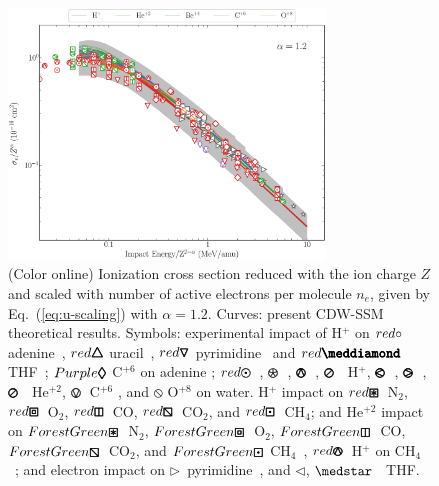 \documentclass[10pt,showpacs,showkeys,twocolumn]{revtex4-1}
\begin{document}
\begin{figure}[!htb]%
\centering
\includegraphics[width=0.75\textwidth]{zmol_werror.eps}
\caption{(Color online) Ionization cross section reduced with the ion
charge $Z$ and scaled with number of active electrons per molecule $n_e$,
given by Eq.~(\ref{eq:u-scaling}) with $\alpha=1.2$. 
Curves: present CDW-SSM theoretical results. 
Symbols: experimental impact of H$^+$ on 
\mbox{\LARGE$\color{red}\circ$} adenine~\cite{iriki2011}, 
{\fontsize{11}{20}$\color{red}\pmb{\triangle}$} uracil~\cite{itoh2013}, 
{\fontsize{11}{20}$\color{red}\pmb{\triangledown}$} pyrimidine~\cite{wolff2014} and 
{\fontsize{10}{20}$\color{red}\pmb{\meddiamond}$} THF~\cite{wang2016};
{\fontsize{11}{20}$\color{Purple}\pmb{\lozenge}$} C$^{+6}$ on adenine \cite{tribedi2019};
\mbox{\fontsize{11}{20}$\color{red}\pmb{\odot}$}~\cite{Luna2007}, 
{\fontsize{11}{20}\color{red}$\pmb{\logof}$}~\cite{Rudd86}, 
{\fontsize{11}{20}\color{red}$\pmb{\varowedge}$}~\cite{pRudd85}, 
{\fontsize{11}{20}\color{red}$\pmb{\varoslash}$}~\cite{toburen80} H$^+$,
{\fontsize{11}{20}\color{ForestGreen}$\pmb{\varolessthan}$}~\cite{Ohsawa05},
{\fontsize{11}{20}\color{ForestGreen}$\pmb{\varogreaterthan}$}~\cite{Rudd85},
{\fontsize{11}{20}\color{ForestGreen}$\pmb{\varoslash}$}~\cite{toburen80} He$^{+2}$,
{\fontsize{11}{20}\color{Purple}$\pmb{\ovee}$}~C$^{+6}$ \cite{DalCappello2009,Bhattacharjee17}, and 
{\fontsize{11}{20}\color{BurntOrange}$\pmb{\obslash}$}
O$^{+8}$ \cite{Tribedi_O_water} on water.
H$^{+}$ impact on 
{\fontsize{11}{20}${\color{red}\pmb{\boxast}}$}~N$_2$, 
{\fontsize{11}{20}${\color{red}\pmb{\boxbox}}$}~O$_2$, 
{\fontsize{11}{20}${\color{red}\pmb{\boxbar}}$}~CO, 
{\fontsize{11}{20}${\color{red}\pmb{\boxbslash}}$}~CO$_2$, and
{\fontsize{11}{20}${\color{red}\pmb{\boxdot}}$}~CH$_4$; 
and He$^{+2}$ impact on 
{\fontsize{11}{20}${\color{ForestGreen}\pmb{\boxast}}$}~N$_2$,
{\fontsize{11}{20}${\color{ForestGreen}\pmb{\boxbox}}$}~O$_2$, 
{\fontsize{11}{20}${\color{ForestGreen}\pmb{\boxbar}}$}~CO, 
{\fontsize{11}{20}${\color{ForestGreen}\pmb{\boxbslash}}$}~CO$_2$, and
{\fontsize{11}{20}${\color{ForestGreen}\pmb{\boxdot}}$} 
CH$_4$~\cite{Rudd85,Rudd1983}, 
{\fontsize{11}{20}${\color{red}\pmb{\varowedge}}$}~H$^{+}$ on 
CH$_4$~\cite{Luna2019}; 
and electron impact on $\rhd$~pyrimidine~\cite{bug2017}, and $\lhd$, 
$\medstar$~\cite{wolf2019,fuss2009} THF.}
\label{fig:zalpha}
\end{figure} 
\end{document}
